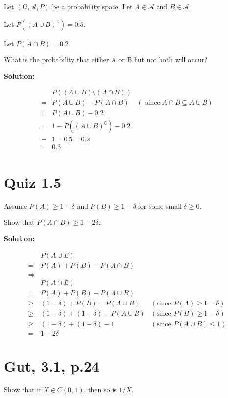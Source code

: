 \documentclass{article}
\begin{document}
Let \((\Omega, \mathcal{A}, P)\) be a probability space.
Let \(A\in \mathcal{A}\) and \(B\in \mathcal{A}\).

Let \(P((A\cup B)^\complement)=0.5\).

Let \(P(A\cap B)=0.2\).

What is the probability that either A or B but not both will occur?

\textbf{Solution:}

\begin{align*}
	 & P((A\cup B)\setminus(A\cap B)) \\
	=& P(A\cup B)-P(A\cap B) & (\text{ since }A\cap B \subseteq A\cup B) \\
	=& P(A\cup B)-0.2 \\
	=& 1-P((A \cup B)^\complement)-0.2 \\
	=& 1-0.5-0.2 \\
	=& 0.3 \\
\end{align*}

\section{Quiz 1.5}

Assume
\(P(A) \geq 1-\delta\) and \(P(B) \geq 1-\delta\) for some small \(\delta\geq0\).

Show that \(P(A\cap B) \geq 1-2\delta\).

\textbf{Solution:}

\begin{align*}
	 & P(A\cup B) \\
	=& P(A)+P(B)-P(A\cap B) \\
	\Rightarrow& \\
	 & P(A\cap B) \\
	=& P(A)+P(B)-P(A\cup B) \\
	\geq& (1-\delta)+P(B)-P(A\cup B) & (\text{since }P(A) \geq 1-\delta) \\
	\geq& (1-\delta)+(1-\delta)-P(A\cup B) & (\text{since }P(B) \geq 1-\delta) \\
	\geq& (1-\delta)+(1-\delta)-1 & (\text{since }P(A\cup B) \leq 1) \\
	=& 1-2\delta
\end{align*}

\section{Gut, 3.1, p.24}

Show that if \(X \in C(0,1)\), then so is \(1/X\).
\end{document}
